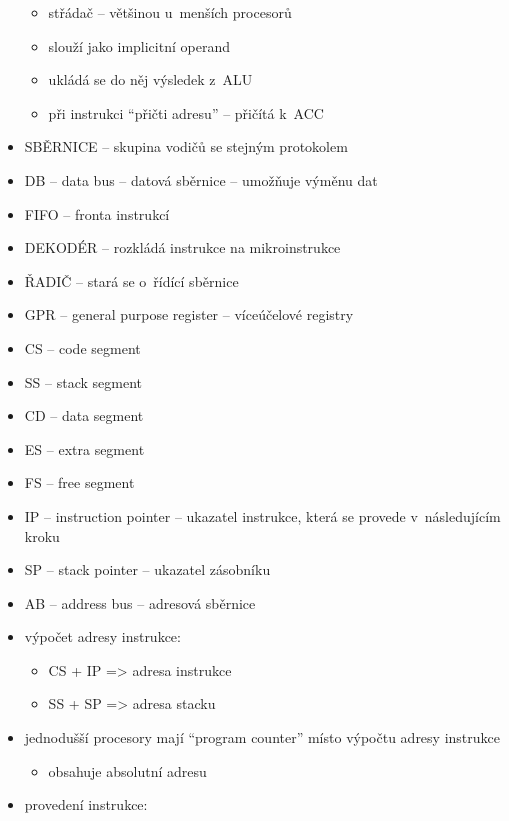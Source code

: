 \documentclass[a4paper,12pt]{article}
\providecommand{\tightlist}{%
\setlength{\itemsep}{0pt}\setlength{\parskip}{0pt}}
\begin{document}
\begin{itemize}
  \begin{itemize}
    \tightlist
    \item střádač -- většinou u~menších procesorů
    \item slouží jako implicitní operand
    \item ukládá se do něj výsledek z~ALU
    \item při instrukci ``přičti adresu'' -- přičítá k~ACC
  \end{itemize}
  \item SBĚRNICE -- skupina vodičů se stejným protokolem
  \item DB -- data bus -- datová sběrnice -- umožňuje výměnu dat
  \item FIFO -- fronta instrukcí
  \item DEKODÉR -- rozkládá instrukce na mikroinstrukce
  \item ŘADIČ -- stará se o~řídící sběrnice
  \item GPR -- general purpose register -- víceúčelové registry
  \item CS -- code segment
  \item SS -- stack segment
  \item CD -- data segment
  \item ES -- extra segment
  \item FS -- free segment
  \item IP -- instruction pointer -- ukazatel instrukce, která se provede
  v~následujícím kroku
  \item SP -- stack pointer -- ukazatel zásobníku
  \item AB -- address bus -- adresová sběrnice
  \item výpočet adresy instrukce:
  
  \begin{itemize}
    \tightlist
    \item CS + IP =\textgreater{} adresa instrukce
    \item SS + SP =\textgreater{} adresa stacku
  \end{itemize}
  \item jednodušší procesory mají ``program counter'' místo výpočtu adresy
  instrukce
  
  \begin{itemize}
    \tightlist
    \item obsahuje absolutní adresu
  \end{itemize}
  \item provedení instrukce:
  

\end{itemize}
\end{document}

